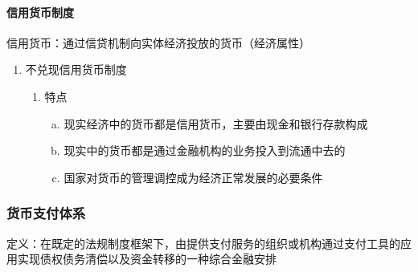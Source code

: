 \documentclass[12pt]{book}
\begin{document}
\paragraph{信用货币制度}

信用货币：通过信贷机制向实体经济投放的货币（经济属性）
\\

\begin{enumerate}[1.]
    \item 不兑现信用货币制度
          \begin{enumerate}[(1)]
              \item 特点
                    \begin{enumerate}[a.]
                        \item 现实经济中的货币都是信用货币，主要由现金和银行存款构成
                        \item 现实中的货币都是通过金融机构的业务投入到流通中去的
                        \item 国家对货币的管理调控成为经济正常发展的必要条件
                    \end{enumerate}
          \end{enumerate}
\end{enumerate}



\subsubsection{货币支付体系}

定义：在既定的法规制度框架下，由提供支付服务的组织或机构通过支付工具的应用实现债权债务清偿以及资金转移的一种综合金融安排
\end{document}
